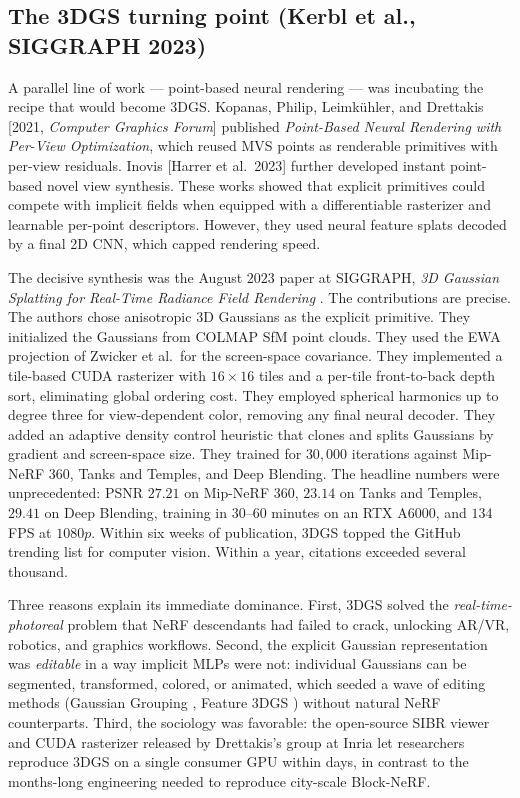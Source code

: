 \documentclass{article}
\begin{document}
\subsection{The 3DGS turning point (Kerbl et al., SIGGRAPH 2023)}\label{the-3dgs-turning-point-kerbl-et-al.-siggraph-2023}

A parallel line of work --- point-based neural rendering --- was incubating the recipe that would become 3DGS. Kopanas, Philip, Leimkühler, and Drettakis {[}2021, \emph{Computer Graphics Forum}{]} published \emph{Point-Based Neural Rendering with Per-View Optimization}, which reused MVS points as renderable primitives with per-view residuals. Inovis {[}Harrer et al.~2023{]} further developed instant point-based novel view synthesis. These works showed that explicit primitives could compete with implicit fields when equipped with a differentiable rasterizer and learnable per-point descriptors. However, they used neural feature splats decoded by a final 2D CNN, which capped rendering speed.

The decisive synthesis was the August \(2023\) paper at SIGGRAPH, \emph{3D Gaussian Splatting for Real-Time Radiance Field Rendering} \cite{kerbl20233dgaussiansplattin}. The contributions are precise. The authors chose anisotropic 3D Gaussians as the explicit primitive. They initialized the Gaussians from COLMAP SfM point clouds. They used the EWA projection of Zwicker et al.~for the screen-space covariance. They implemented a tile-based CUDA rasterizer with \(16{\times}16\) tiles and a per-tile front-to-back depth sort, eliminating global ordering cost. They employed spherical harmonics up to degree three for view-dependent color, removing any final neural decoder. They added an adaptive density control heuristic that clones and splits Gaussians by gradient and screen-space size. They trained for \(30{,}000\) iterations against Mip-NeRF 360, Tanks and Temples, and Deep Blending. The headline numbers were unprecedented: PSNR \(27.21\) on Mip-NeRF 360, \(23.14\) on Tanks and Temples, \(29.41\) on Deep Blending, training in \(30\)--\(60\) minutes on an RTX A6000, and \(134\) FPS at \(1080p\). Within six weeks of publication, 3DGS topped the GitHub trending list for computer vision. Within a year, citations exceeded several thousand.

Three reasons explain its immediate dominance. First, 3DGS solved the \emph{real-time-photoreal} problem that NeRF descendants had failed to crack, unlocking AR/VR, robotics, and graphics workflows. Second, the explicit Gaussian representation was \emph{editable} in a way implicit MLPs were not: individual Gaussians can be segmented, transformed, colored, or animated, which seeded a wave of editing methods (Gaussian Grouping \cite{ye2024gaussiangroupingse}, Feature 3DGS \cite{zhou2024drivinggaussiancom}) without natural NeRF counterparts. Third, the sociology was favorable: the open-source SIBR viewer and CUDA rasterizer released by Drettakis's group at Inria let researchers reproduce 3DGS on a single consumer GPU within days, in contrast to the months-long engineering needed to reproduce city-scale Block-NeRF.
\end{document}
